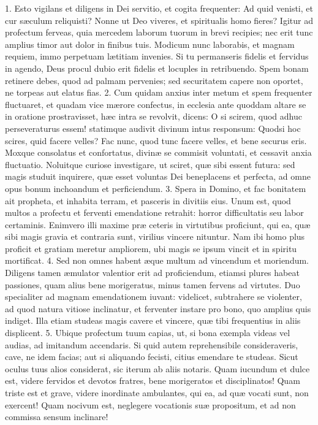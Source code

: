 1. Esto vigilans et diligens in Dei servitio, et cogita frequenter: Ad quid venisti, et cur sæculum reliquisti? Nonne ut Deo viveres, et spiritualis homo fieres? Igitur ad profectum ferveas, quia mercedem laborum tuorum in brevi recipies; nec erit tunc amplius timor aut dolor in finibus tuis. Modicum nunc laborabis, et magnam requiem, immo perpetuam lætitiam invenies. Si tu permanseris fidelis et fervidus in agendo, Deus procul dubio erit fidelis et locuples in retribuendo. Spem bonam retinere debes, quod ad palmam pervenies; sed securitatem capere non oportet, ne torpeas aut elatus fias.
2. Cum quidam anxius inter metum et spem frequenter fluctuaret, et quadam vice mærore confectus, in ecclesia ante quoddam altare se in oratione prostravisset, hæc intra se revolvit, dicens: O si scirem, quod adhuc perseveraturus essem! statimque audivit divinum intus responsum: Quodsi hoc scires, quid facere velles? Fac nunc, quod tunc facere velles, et bene securus eris. Moxque consolatus et confortatus, divinæ se commisit voluntati, et cessavit anxia fluctuatio. Noluitque curiose investigare, ut sciret, quæ sibi essent futura: sed magis studuit inquirere, quæ esset voluntas Dei beneplacens et perfecta, ad omne opus bonum inchoandum et perficiendum.
3. Spera in Domino, et fac bonitatem ait propheta, et inhabita terram, et pasceris in divitiis eius. Unum est, quod multos a profectu et ferventi emendatione retrahit: horror difficultatis seu labor certaminis. Enimvero illi maxime præ ceteris in virtutibus proficiunt, qui ea, quæ sibi magis gravia et contraria sunt, virilius vincere nituntur. Nam ibi homo plus proficit et gratiam meretur ampliorem, ubi magis se ipsum vincit et in spiritu mortificat.
4. Sed non omnes habent æque multum ad vincendum et moriendum. Diligens tamen æmulator valentior erit ad proficiendum, etiamsi plures habeat passiones, quam alius bene morigeratus, minus tamen fervens ad virtutes. Duo specialiter ad magnam emendationem iuvant: videlicet, subtrahere se violenter, ad quod natura vitiose inclinatur, et ferventer instare pro bono, quo amplius quis indiget. Illa etiam studeas magis cavere et vincere, quæ tibi frequentius in aliis displicent.
5. Ubique profectum tuum capias, ut, si bona exempla videas vel audias, ad imitandum accendaris. Si quid autem reprehensibile consideraveris, cave, ne idem facias; aut si aliquando fecisti, citius emendare te studeas. Sicut oculus tuus alios considerat, sic iterum ab aliis notaris. Quam iucundum et dulce est, videre fervidos et devotos fratres, bene morigeratos et disciplinatos! Quam triste est et grave, videre inordinate ambulantes, qui ea, ad quæ vocati sunt, non exercent! Quam nocivum est, neglegere vocationis suæ propositum, et ad non commissa sensum inclinare!
